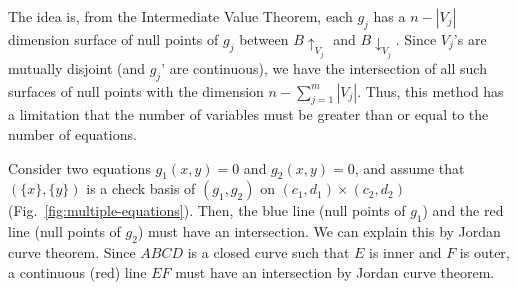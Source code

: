 \documentclass[runningheads,a4paper,oribibl]{llncs}
\begin{document}
The idea is, from the Intermediate Value Theorem,
each $g_j$ has a $n - |V_{j}|$ dimension surface of null points of $g_j$
between $B\uparrow_{V_j}$ and $B\downarrow_{V_j}$. 
Since $V_j$'s are mutually disjoint (and $g_j$' are continuous),
we have the intersection of all such surfaces of null points with
the dimension $n - \sum_{j=1}^m |V_j|$.
Thus, this method has a limitation that 
the number of variables must be greater than or equal to the number of equations.

\begin{example}
  Consider two equations $g_1(x, y)=0$ and $g_2(x, y) = 0$, and assume that $(\{x\}, \{y\})$
  is a check basis of $(g_1, g_2)$ on $(c_1,d_1) \times (c_2,d_2)$ (Fig.~\ref{fig:multiple-equations}).
  Then, the blue line (null points of $g_1$) and the red line (null points of $g_2$) must have
  an intersection. We can explain this by Jordan curve theorem. 
  Since $ABCD$ is a closed curve such that $E$ is inner and $F$ is outer,
  a continuous (red) line $EF$ must have an intersection by Jordan curve theorem. 
\end{example}
\end{document}
